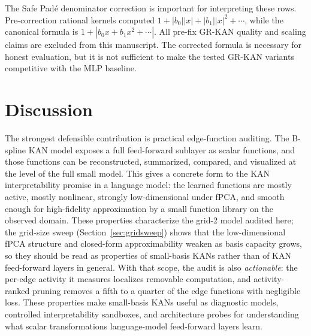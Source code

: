 \documentclass[11pt]{article}
\newcommand{\modelname}[1]{\textsc{#1}}
\newcommand{\grkan}{\modelname{GR-KAN}}
\begin{document}
The Safe Pad\'{e} denominator correction is important for interpreting these rows. Pre-correction rational kernels computed \(1+|b_0||x|+|b_1||x|^2+\cdots\), while the canonical formula is \(1+|b_0x+b_1x^2+\cdots|\). All pre-fix \grkan{} quality and scaling claims are excluded from this manuscript. The corrected formula is necessary for honest evaluation, but it is not sufficient to make the tested \grkan{} variants competitive with the MLP baseline.

\section{Discussion}

The strongest defensible contribution is practical edge-function auditing. The B-spline KAN model exposes a full feed-forward sublayer as scalar functions, and those functions can be reconstructed, summarized, compared, and visualized at the level of the full small model. This gives a concrete form to the KAN interpretability promise in a language model: the learned functions are mostly active, mostly nonlinear, strongly low-dimensional under fPCA, and smooth enough for high-fidelity approximation by a small function library on the observed domain. These properties characterize the grid-2 model audited here; the grid-size sweep (Section~\ref{sec:gridsweep}) shows that the low-dimensional fPCA structure and closed-form approximability weaken as basis capacity grows, so they should be read as properties of small-basis KANs rather than of KAN feed-forward layers in general. With that scope, the audit is also \emph{actionable}: the per-edge activity it measures localizes removable computation, and activity-ranked pruning removes a fifth to a quarter of the edge functions with negligible loss. These properties make small-basis KANs useful as diagnostic models, controlled interpretability sandboxes, and architecture probes for understanding what scalar transformations language-model feed-forward layers learn.
\end{document}
